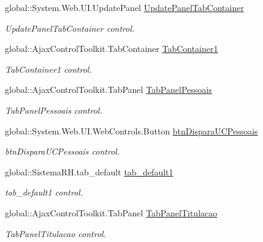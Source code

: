 \begin{DoxyCompactItemize}
global::System.Web.UI.UpdatePanel \hyperlink{class_sistema_r_h_1_1_cadastro_docs_a2f0aad0f94f3bdc6c1047f6fc2509544}{UpdatePanelTabContainer}
\begin{DoxyCompactList}\small\item\em UpdatePanelTabContainer control. \item\end{DoxyCompactList}\item 
global::AjaxControlToolkit.TabContainer \hyperlink{class_sistema_r_h_1_1_cadastro_docs_ae16b8fe37c2be10be0e70b2d50292d54}{TabContainer1}
\begin{DoxyCompactList}\small\item\em TabContainer1 control. \item\end{DoxyCompactList}\item 
global::AjaxControlToolkit.TabPanel \hyperlink{class_sistema_r_h_1_1_cadastro_docs_af70eb4a83950527be5018dbfbef36fcc}{TabPanelPessoais}
\begin{DoxyCompactList}\small\item\em TabPanelPessoais control. \item\end{DoxyCompactList}\item 
global::System.Web.UI.WebControls.Button \hyperlink{class_sistema_r_h_1_1_cadastro_docs_aa5743f25e56e06c7f634e9a018c9c353}{btnDisparaUCPessoais}
\begin{DoxyCompactList}\small\item\em btnDisparaUCPessoais control. \item\end{DoxyCompactList}\item 
global::SistemaRH.tab\_\-default \hyperlink{class_sistema_r_h_1_1_cadastro_docs_ae1b5d8ddeb7251752f78e171a3b7491c}{tab\_\-default1}
\begin{DoxyCompactList}\small\item\em tab\_\-default1 control. \item\end{DoxyCompactList}\item 
global::AjaxControlToolkit.TabPanel \hyperlink{class_sistema_r_h_1_1_cadastro_docs_a6584da713de60909f4ffaf2129db77ea}{TabPanelTitulacao}
\begin{DoxyCompactList}\small\item\em TabPanelTitulacao control. \item\end{DoxyCompactList}\item 

\end{DoxyCompactItemize}
